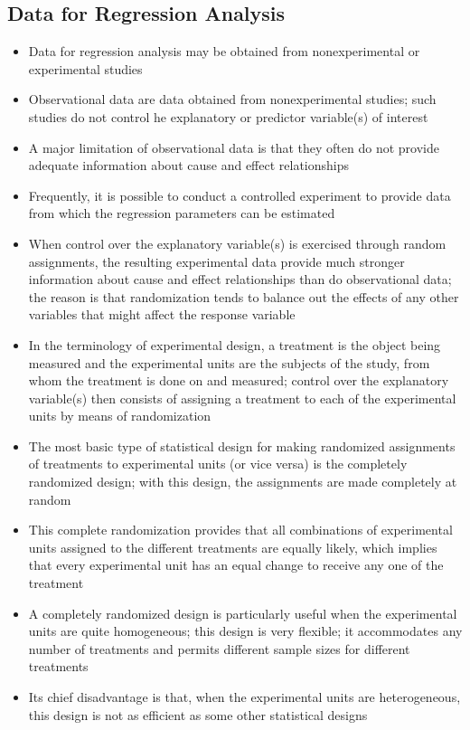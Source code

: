 \subsection{Data for Regression Analysis}
\begin{itemize}
\item Data for regression analysis may be obtained from nonexperimental or experimental studies
\item Observational data are data obtained from nonexperimental studies; such studies do not control he explanatory or predictor variable(s) of interest 
\item A major limitation of observational data is that they often do not provide adequate information about cause and effect relationships 
\item Frequently, it is possible to conduct a controlled experiment to provide data from which the regression parameters can be estimated 
\item When control over the explanatory variable(s) is exercised through random assignments, the resulting experimental data provide much stronger information about cause and effect relationships than do observational data; the reason is that randomization tends to balance out the effects of any other variables that might affect the response variable
\item In the terminology of experimental design, a treatment is the object being measured and the experimental units are the subjects of the study, from whom the treatment is done on and measured; control over the explanatory variable(s) then consists of assigning a treatment to each of the experimental units by means of randomization
\item The most basic type of statistical design for making randomized assignments of treatments to experimental units (or vice versa) is the completely randomized design; with this design, the assignments are made completely at random
\item This complete randomization provides that all combinations of experimental units assigned to the different treatments are equally likely, which implies that every experimental unit has an equal change to receive any one of the treatment
\item A completely randomized design is particularly useful when the experimental units are quite homogeneous; this design is very flexible; it accommodates any number of treatments and permits different sample sizes for different treatments 
\item Its chief disadvantage is that, when the experimental units are heterogeneous, this design is not as efficient as some other statistical designs
\end{itemize}

